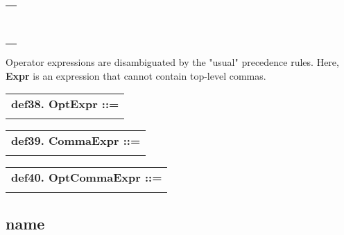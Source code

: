 \documentclass{report}
\begin{document}
\begin{tabular}{l}
\hspace*{3mm}{\tt  $\mid$ "\{" CommaExpr "\}"} \\ 
\hspace*{3mm}{\tt  $\mid$ QuoteExpr} \\ 
\hspace*{3mm}{\tt  $\mid$ TryCatchExpr} \\ 
\hspace*{3mm}{\tt  $\mid$ IfExpr} \\ 
\hspace*{3mm}{\tt  $\mid$ RepeatExpr} \\ 
\hspace*{3mm}{\tt  $\mid$ ForExpr} \\ 
\hspace*{3mm}{\tt  $\mid$ SwitchExpr} \\ 
\hspace*{3mm}{\tt  $\mid$ VarDef} \\ 
\hspace*{3mm}{\tt  $\mid$ ProcedureDef} \\ 
\end{tabular}



Operator expressions are disambiguated by the "usual" precedence
rules. Here, {\bf Expr} is an expression that cannot contain top-level
commas.

\begin{tabular}{l}
{\bf def38. OptExpr ::= }\\ 
\hspace*{3mm}{\tt {[}(Expr){]}} \\ 
\end{tabular}



\begin{tabular}{l}
{\bf def39. CommaExpr ::= }\\ 
\hspace*{3mm}{\tt Expr++ ","} \\ 
\end{tabular}



\begin{tabular}{l}
{\bf def40. OptCommaExpr ::= }\\ 
\hspace*{3mm}{\tt {[}(CommaExpr){]}} \\ 
\end{tabular}



\subsection{name}
\end{document}
